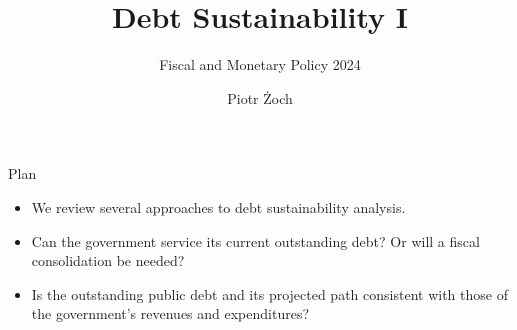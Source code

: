 \documentclass[11pt,xcolor={dvipsnames},aspectratio=159,hyperref={pdftex,pdfpagemode=UseNone,hidelinks,pdfdisplaydoctitle=true},usepdftitle=false]{beamer}
\begin{document}
\title{Debt Sustainability I}
\subtitle{Fiscal and Monetary Policy 2024}

\author{Piotr Żoch}%
\frame{\titlepage}

\begin{frame}{Plan}
    \begin{itemize}
    \item We review several approaches to debt sustainability analysis.
    \item Can the government service its current outstanding debt? Or will a fiscal consolidation be needed?
    \item Is the outstanding public debt and its projected path consistent with those of the government's revenues and expenditures?
   
    \end{itemize}
\end{frame}


\begin{frame}
\end{frame}
\end{document}
